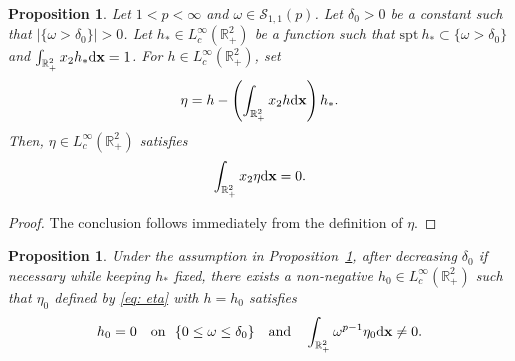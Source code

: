 \documentclass[11pt]{amsart}
\newtheorem{proposition}[theorem]{Proposition}
\theoremstyle{definition}
\theoremstyle{definition}
\numberwithin{equation}{section}
\newcommand{\0}{\emptyset}
\newcommand{\bfx}{{\bf x}}
\newcommand{\calS}{\mathcal S}
\newcommand{\dd}{\mathrm{d}}
\begin{document}
		
		\begin{proposition}\label{prop:h_aux}
			Let $1<p<\infty$ and $\omega\in \calS_{1,1}(p)$. Let $\delta_0>0$ be a constant such that $|\{\omega>\delta_0\}|>0$. Let $h_{*}\in L^{\infty}_{c}(\mathbb{R}^{2}_{+})$ be a function such that $\textrm{spt}\ h_{*}\subset \{\omega>\delta_0\}$ and $\int_{\mathbb{R}^{2}_{+}}x_2 h_{*}\dd\bfx=1$. For $h\in L^{\infty}_{c}(\mathbb{R}^{2}_{+})$, set 
			\begin{align}
				\eta=h-\left(\int_{\mathbb{R}^{2}_{+}}x_2 h\dd\bfx \right)h_{*}.   \label{eq: eta}
			\end{align}
			Then, $\eta\in L^{\infty}_c(\mathbb{R}^{2}_{+})$ satisfies 
			\begin{equation}
				\begin{aligned}
					\int_{\mathbb{R}^{2}_{+}}x_2 \eta \dd\bfx=0.   
				\end{aligned}
				\label{eq: etacond}
			\end{equation}
		\end{proposition}
		
		\begin{proof}
			The conclusion follows immediately from the definition of $\eta$.
		\end{proof}
		
		
		\begin{proposition}\label{p: existenceh_0}
        {
        Under the assumption in Proposition~\ref{prop:h_aux}, after decreasing $\delta_0$ if necessary while keeping $h_*$ fixed, there exists} a non-negative $h_0\in L^{\infty}_{c}(\mathbb{R}^{2}_{+})$ such that $\eta_0$ defined by \eqref{eq: eta} {with $h = h_0$} satisfies  
			\begin{align}
			 { h_0 = 0 \quad \textrm{on }\,\, \{0 \le \omega \le \delta_0 \} \quad \textrm{and} \quad} 	\int_{\mathbb{R}^{2}_{+}}\omega^{p-1}\eta_0 \dd\bfx\neq 0.   \label{eq: nonzero}
			\end{align} 
                        
		\end{proposition}
\end{document}
